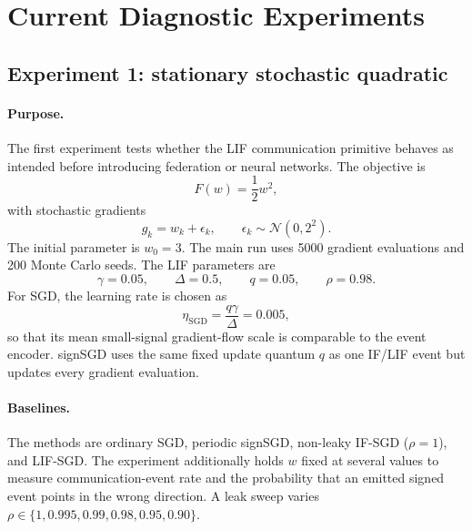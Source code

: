 \section{Current Diagnostic Experiments}

\subsection{Experiment 1: stationary stochastic quadratic}

\paragraph{Purpose.}
The first experiment tests whether the LIF communication primitive behaves as intended before introducing federation or neural networks. The objective is
\begin{equation}
  F(w)=\frac12 w^2,
\end{equation}
with stochastic gradients
\begin{equation}
  g_k=w_k+\epsilon_k,\qquad \epsilon_k\sim\mathcal{N}(0,2^2).
\end{equation}
The initial parameter is $w_0=3$. The main run uses 5000 gradient evaluations and 200 Monte Carlo seeds. The LIF parameters are
\begin{equation}
  \gamma=0.05,\qquad \Delta=0.5,\qquad q=0.05,\qquad \rho=0.98.
\end{equation}
For SGD, the learning rate is chosen as
\begin{equation}
  \eta_{\mathrm{SGD}}=\frac{q\gamma}{\Delta}=0.005,
\end{equation}
so that its mean small-signal gradient-flow scale is comparable to the event encoder. signSGD uses the same fixed update quantum $q$ as one IF/LIF event but updates every gradient evaluation.

\paragraph{Baselines.}
The methods are ordinary SGD, periodic signSGD, non-leaky IF-SGD ($\rho=1$), and LIF-SGD. The experiment additionally holds $w$ fixed at several values to measure communication-event rate and the probability that an emitted signed event points in the wrong direction. A leak sweep varies $\rho\in\{1,0.995,0.99,0.98,0.95,0.90\}$.

